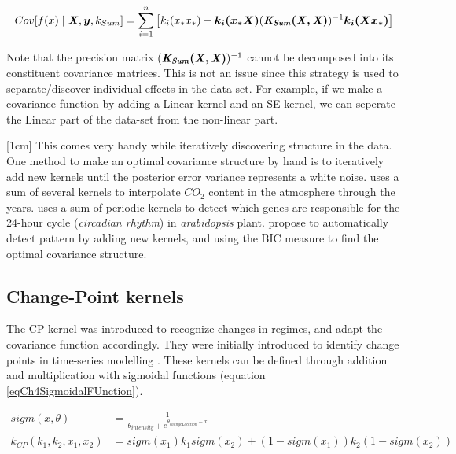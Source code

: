 \begin{equation}\label{eqCh5PosteriorSumVariance}
Cov[f(x) \mid \bm{\mathit{X}}, \boldsymbol{y}, k_{Sum}] = \sum_{i=1}^{n} \left[ k_{i}(x_{*}x_{*}) - \boldsymbol{k_{i}(x_{*}X)}( \bm{\mathit{K_{Sum}(X, X)}} )^{-1} \boldsymbol{k_{i}(Xx_{*})} \right ]
\end{equation}

Note that the precision matrix $( \bm{\mathit{K_{Sum}(X, X)}} )^{-1}$ cannot be decomposed into its constituent covariance matrices. This is not an issue since this strategy is used to separate/discover individual effects in the data-set. For example, if we make a covariance function by adding a Linear kernel and an SE kernel, we can seperate the Linear part of the data-set from the non-linear part. 

[1cm]
This comes very handy while iteratively discovering structure in the data. One method to make an optimal covariance structure by hand is to iteratively add new kernels until the posterior error variance represents a white noise. \cite{Rasmussen2005} uses a sum of several kernels to interpolate $CO_{2}$ content in the atmosphere through the years. \cite{durrande2013gaussian} uses a sum of periodic kernels to detect which genes are responsible for the 24-hour cycle (\textit{circadian rhythm}) in \textit{arabidopsis} plant. \cite{duvenaud2013structure, lloyd2014automatic} propose to automatically detect pattern by adding new kernels, and using the BIC measure to find the optimal covariance structure. 

\subsection{Change-Point kernels}\label{subSecCh4CPKernel}
The CP kernel was introduced to recognize changes in regimes, and adapt the covariance function accordingly. They were initially introduced to identify change points in time-series modelling \cite{osborne2010bayesian, saatcci2010gaussian}. These kernels can be defined through addition and multiplication with sigmoidal functions (equation \ref{eqCh4SigmoidalFUnction}). 

\begin{align}
sigm(x, \theta) & = \frac{1}{\theta_{intensity} + e^{\theta_{changeLocation}-x}} \label{eqCh4SigmoidalFUnction} \\
k_{CP}(k_{1}, k_{2}, x_{1}, x_{2}) & = sigm(x_{1})k_{1}sigm(x_{2}) + (1-sigm(x_{1}))k_{2}(1-sigm(x_{2})) \label{eq:changePointKernel}
\end{align}

